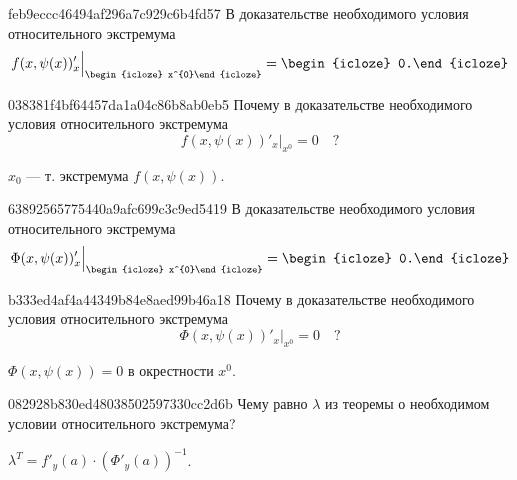 \begin{note}{feb9eccc46494af296a7c929c6b4fd57}
    В доказательстве необходимого условия относительного экстремума
    \[
        f(x, \psi(x))'_{x} \Big|_{\begin{icloze}{2}x^{0}\end{icloze}} = \begin{icloze}{1}0.\end{icloze}
    \]
\end{note}

\begin{note}{038381f4bf64457da1a04c86b8ab0eb5}
    Почему в доказательстве необходимого условия относительного экстремума
    \[
        f(x, \psi(x))'_{x} \Big|_{x^{0}} = 0 \quad \text{?}
    \]

    \begin{cloze}{1}
        \({ x_{0} }\) --- т. экстремума \({ f(x, \psi(x)) }\).
    \end{cloze}
\end{note}

\begin{note}{63892565775440a9afc699c3c9ed5419}
    В доказательстве необходимого условия относительного экстремума
    \[
        \Phi(x, \psi(x))'_{x} \Big|_{\begin{icloze}{2}x^{0}\end{icloze}} = \begin{icloze}{1}0.\end{icloze}
    \]
\end{note}

\begin{note}{b333ed4af4a44349b84e8aed99b46a18}
    Почему в доказательстве необходимого условия относительного экстремума
    \[
        \Phi(x, \psi(x))'_{x} \Big|_{x^{0}} = 0 \quad \text{?}
    \]

    \begin{cloze}{1}
        \({ \Phi(x, \psi(x)) = 0 }\) в окрестности \({ x^{0} }\).
    \end{cloze}
\end{note}

\begin{note}{082928b830ed48038502597330cc2d6b}
    Чему равно \({ \lambda }\) из теоремы о необходимом условии относительного экстремума?

    \begin{cloze}{1}
        \({ \lambda^{T} = f'_{y}(a) \cdot \left( \Phi'_{y}(a) \right)^{-1} }\).
    \end{cloze}
\end{note}

